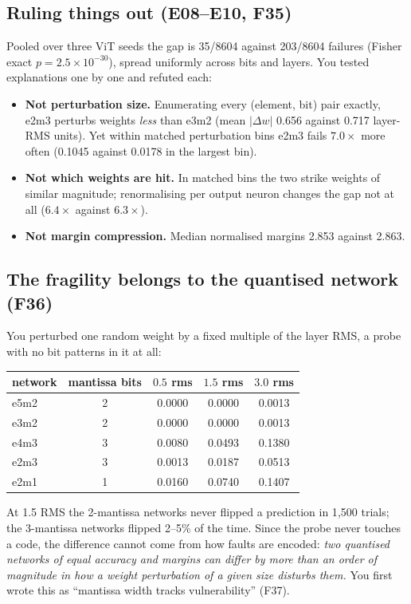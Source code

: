 \subsection{Ruling things out (E08--E10, F35)}
Pooled over three ViT seeds the gap is 35/8604 against 203/8604 failures (Fisher exact $p=2.5\times10^{-30}$), spread uniformly across bits and layers. You tested explanations one by one and refuted each:
\begin{itemize}
\item \textbf{Not perturbation size.} Enumerating every (element, bit) pair exactly, e2m3 perturbs weights \emph{less} than e3m2 (mean $|\Delta w|$ 0.656 against 0.717 layer-RMS units). Yet within matched perturbation bins e2m3 fails $7.0\times$ more often (0.1045 against 0.0178 in the largest bin).
\item \textbf{Not which weights are hit.} In matched bins the two strike weights of similar magnitude; renormalising per output neuron changes the gap not at all ($6.4\times$ against $6.3\times$).
\item \textbf{Not margin compression.} Median normalised margins 2.853 against 2.863.
\end{itemize}

\subsection{The fragility belongs to the quantised network (F36)}
You perturbed one random weight by a fixed multiple of the layer RMS, a probe with no bit patterns in it at all:
\begin{center}
\small
\begin{tabular}{lcccc}
\toprule
network & mantissa bits & $0.5$ rms & $1.5$ rms & $3.0$ rms \\
\midrule
e5m2 & 2 & 0.0000 & 0.0000 & 0.0013 \\
e3m2 & 2 & 0.0000 & 0.0000 & 0.0013 \\
e4m3 & 3 & 0.0080 & 0.0493 & 0.1380 \\
e2m3 & 3 & 0.0013 & 0.0187 & 0.0513 \\
e2m1 & 1 & 0.0160 & 0.0740 & 0.1407 \\
\bottomrule
\end{tabular}
\end{center}
At 1.5 RMS the 2-mantissa networks never flipped a prediction in 1{,}500 trials; the 3-mantissa networks flipped 2--5\% of the time. Since the probe never touches a code, the difference cannot come from how faults are encoded: \emph{two quantised networks of equal accuracy and margins can differ by more than an order of magnitude in how a weight perturbation of a given size disturbs them.}
You first wrote this as ``mantissa width tracks vulnerability'' (F37).

